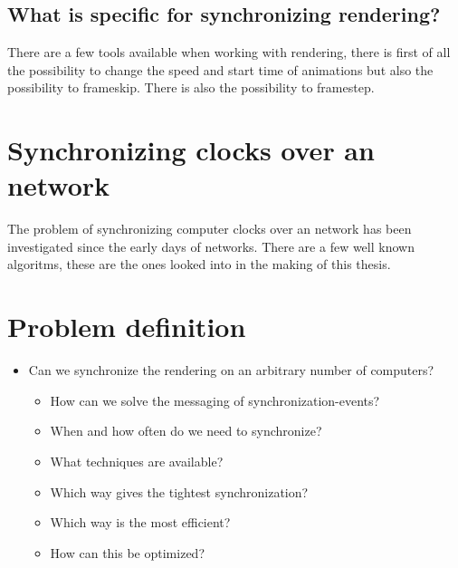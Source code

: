 \subsection{What is specific for synchronizing rendering?}
There are a few tools available when working with rendering, there is first of all the possibility to change the speed and start time of animations but also the possibility to frameskip. There is also the possibility to framestep. 

\section{Synchronizing clocks over an network}
The problem of synchronizing computer clocks over an network has been investigated since the early days of networks. There are a few well known algoritms, these are the ones looked into in the making of this thesis. 





\section{Problem definition}
\label{sec:problem_definition}

\begin{itemize}
  \item Can we synchronize the rendering on an arbitrary number of computers?
  \begin{itemize}
    \item How can we solve the messaging of synchronization-events?
  	\item When and how often do we need to synchronize?
    \item What techniques are available?
    \item Which way gives the tightest synchronization?
    \item Which way is the most efficient?
  	\item How can this be optimized?
  \end{itemize}
\end{itemize}
